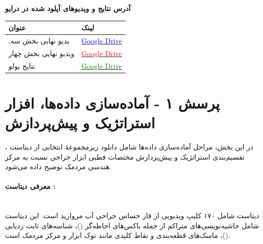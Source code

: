 \documentclass{article}
\begin{document}
	
	
	
	\clearpage
	
	\thispagestyle{empty}
	
	\begin{center}
		{\Huge \textbf{آدرس نتایج و ویدیوهای آپلود شده در درایو}}\\[1cm]
	\end{center}
	
	\renewcommand{\arraystretch}{2}
	
	\begin{table}[h]
		\centering
		\begin{tabular}{|p{5cm}|p{10cm}|}
			\hline
			\textbf{عنوان} & \textbf{لینک} \\
			\hline
			
			,یدیو نهایی بخش سه &
			\href{https://drive.google.com/file/d/1E7iqQIcYT6rXC16EVkipGac5xEaW6eFj/view?usp=sharing}
			{\textcolor{blue}{Google Drive}}
			\\
			\hline
			
			ویدیو نهایی بخش چهار &
			\href{https://drive.google.com/file/d/1iZoXWrEDb_ydSe7a-_ptMC1f2AUuu9DS/view?usp=sharing}
			{\textcolor{red}{Google Drive}}
			\\
			\hline
			
			نتایج یولو &
			\href{https://drive.google.com/file/d/1reqKynoItW0y2E8yuoKeKA44XZyJRbb3/view?usp=sharing}
			{\textcolor{green}{Google Drive}}
			\\
			\hline
			
			
		\end{tabular}
	\end{table}
	
	\clearpage
	
	\tableofcontents
	\clearpage
	
	\listoffigures
	\clearpage
	
	\listoftables
	\clearpage
	
	\lstlistoflistings
	\clearpage

\section{پرسش ۱ - آماده‌سازی داده‌ها، افزار استراتژیک و پیش‌پردازش}

در این بخش، مراحل آماده‌سازی داده‌ها شامل دانلود زیرمجموعۀ انتخابی از دیتاست ، تقسیم‌بندی استراتژیک و پیش‌پردازش مختصات قطبی ابزار جراحی نسبت به مرکز هندسی مردمک توضیح داده می‌شود.

\paragraph{معرفی دیتاست :} \mbox{}\\
دیتاست  شامل ۱۷۰ کلیپ ویدیویی از فاز حساس  جراحی آب مروارید است. این دیتاست شامل حاشیه‌نویسی‌های متراکم از جمله باکس‌های احاطه‌گر ()، شناسه‌های ثابت ردیابی ()، ماسک‌های قطعه‌بندی و نقاط کلیدی مانند نوک ابزار و مرکز مردمک است.
\end{document}
